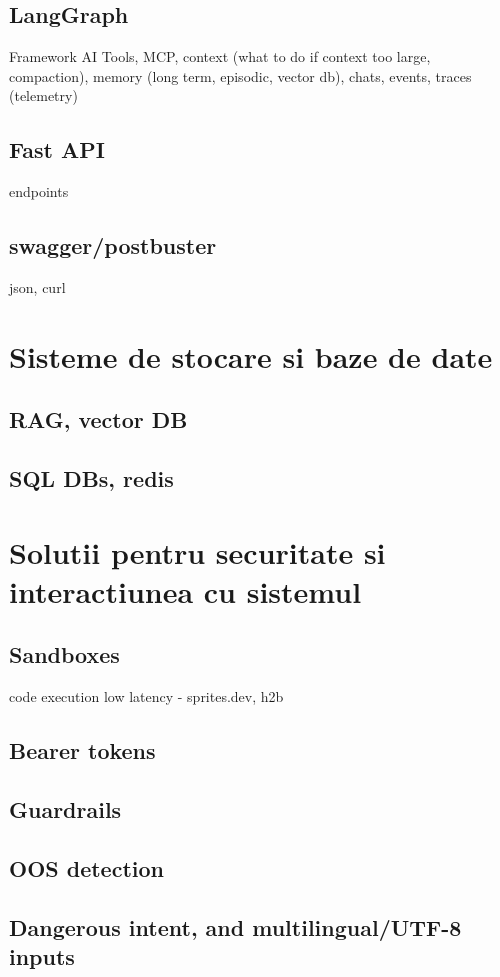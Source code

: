 \documentclass[12pt, a4paper, oneside, romanian, draft]{teza-upb}
\begin{document}
    \subsection{LangGraph}
    Framework AI
    Tools, MCP, context (what to do if context too large, compaction), memory (long term, episodic, vector db), chats,
    events, traces (telemetry)
    \subsection{Fast API}
    endpoints
    \subsection{swagger/postbuster}
    json, curl


  \section{Sisteme de stocare si baze de date}
    \subsection{RAG, vector DB}
    \subsection{SQL DBs, redis}


  \section{Solutii pentru securitate si interactiunea cu sistemul}
    \subsection{Sandboxes}
    code execution low latency - sprites.dev, h2b
    \subsection{Bearer tokens}
    \subsection{Guardrails}
    \subsection{OOS detection}
    \subsection{Dangerous intent, and multilingual/UTF-8 inputs}
\end{document}
